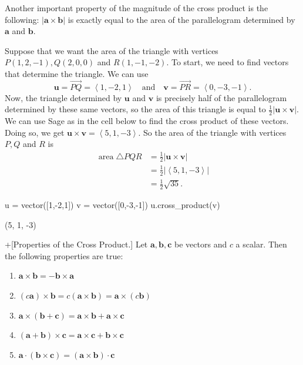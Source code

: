 \documentclass[10pt,]{book}
\theoremstyle{ptxplainnotitle}
\theoremstyle{ptxplaintitle}
\theoremstyle{ptxplainnotitle}
\theoremstyle{ptxplaintitle}
\theoremstyle{ptxplainnotitle}
\theoremstyle{ptxplaintitle}
\theoremstyle{ptxdefinitionnotitle}
\theoremstyle{ptxdefinitiontitle}
\theoremstyle{ptxdefinitionnotitle}
\theoremstyle{ptxdefinitiontitle}
\theoremstyle{ptxdefinitionnotitle}
\theoremstyle{ptxdefinitiontitle}
\theoremstyle{ptxdefinitionnotitle}
\theoremstyle{ptxdefinitiontitle}
\theoremstyle{ptxdefinitionnotitle}
\theoremstyle{ptxdefinitiontitle}
\numberwithin{equation}{section}
\newcommand{\vv}[1]{\mathbf{#1}}
\newcommand{\dotprod}[1]{\left\langle #1 \right\rangle}
\begin{document}
\hypertarget{p-838}{}%
Another important property of the magnitude of the cross product is the following: \(|\vv{a}\times\vv{b}|\) is exactly equal to the area of the parallelogram determined by \(\vv{a}\) and \(\vv{b}\).%
\begin{example}\label{example-areas-of-triangles}
\hypertarget{p-839}{}%
Suppose that we want the area of the triangle with vertices \(P(1,2,-1), Q(2,0,0)\) and \(R(1,-1,-2)\). To start, we need to find vectors that determine the triangle. We can use%
%
\begin{equation*}
\vv{u} = \vec{PQ} = \dotprod{1,-2,1}\quad\text{and}\quad\vv{v} = \vec{PR} = \dotprod{0,-3,-1}.
\end{equation*}
\hypertarget{p-840}{}%
Now, the triangle determined by \(\vv{u}\) and \(\vv{v}\) is precisely half of the parallelogram determined by these same vectors, so the area of this triangle is equal to \(\frac{1}{2}|\vv{u}\times\vv{v}|\). We can use Sage as in the cell below to find the cross product of these vectors. Doing so, we get \(\vv{u}\times\vv{v} = \dotprod{5,1,-3}.\) So the area of the triangle with vertices \(P,Q\) and \(R\) is%
%
\begin{align*}
\operatorname{area} \triangle PQR & = \frac{1}{2}|\vv{u}\times\vv{v}| \\
& = \frac{1}{2}|\dotprod{5,1,-3}| \\
& = \frac{1}{2}\sqrt{35}. 
\end{align*}
\end{example}
\begin{sageinput}
u = vector([1,-2,1])
v = vector([0,-3,-1])
u.cross_product(v)
\end{sageinput}
\begin{sageoutput}
(5, 1, -3)
\end{sageoutput}
\begin{theorem}+[{Properties of the Cross Product.}]\label{theorem-properties-of-the-cross-product}
\hypertarget{p-841}{}%
Let \(\vv{a},\vv{b},\vv{c}\) be vectors and \(c\) a scalar. Then the following properties are true:%
\leavevmode%
\begin{multicols}{2}
\begin{enumerate}
\item\hypertarget{li-65}{}\(\vv{a}\times\vv{b} = -\vv{b}\times\vv{a}\)%
\item\hypertarget{li-66}{}\((c\vv{a})\times\vv{b} = c(\vv{a}\times\vv{b}) = \vv{a}\times(c\vv{b})\)%
\item\hypertarget{li-67}{}\(\vv{a}\times(\vv{b}+\vv{c}) = \vv{a}\times\vv{b}+\vv{a}\times\vv{c}\)%
\item\hypertarget{li-68}{}\((\vv{a}+\vv{b})\times\vv{c} = \vv{a}\times\vv{c}+\vv{b}\times\vv{c}\)%
\item\hypertarget{li-69}{}\(\vv{a}\cdot(\vv{b}\times\vv{c}) = (\vv{a}\times\vv{b})\cdot\vv{c}\)%
\end{enumerate}
\end{multicols}
\end{theorem}
\end{document}
